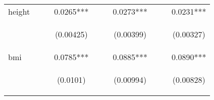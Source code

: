 \documentclass{article}[11pt,subeqn]
\begin{document}
\begin{spacing}{1.25}
\begin{sidewaystable}[!htbp]
\begin{center}
\begin{tabular}{lccccccccc}
height &  &  & 0.0265*** &  &  & 0.0273*** &  &  & 0.0231*** \\
\vspace{4pt} & \begin{footnotesize}\end{footnotesize} & \begin{footnotesize}\end{footnotesize} & \begin{footnotesize}(0.00425)\end{footnotesize} & \begin{footnotesize}\end{footnotesize} & \begin{footnotesize}\end{footnotesize} & \begin{footnotesize}(0.00399)\end{footnotesize} & \begin{footnotesize}\end{footnotesize} & \begin{footnotesize}\end{footnotesize} & \begin{footnotesize}(0.00327)\end{footnotesize} \\
bmi &  &  & 0.0785*** &  &  & 0.0885*** &  &  & 0.0890*** \\
\vspace{4pt} & \begin{footnotesize}\end{footnotesize} & \begin{footnotesize}\end{footnotesize} & \begin{footnotesize}(0.0101)\end{footnotesize} & \begin{footnotesize}\end{footnotesize} & \begin{footnotesize}\end{footnotesize} & \begin{footnotesize}(0.00994)\end{footnotesize} & \begin{footnotesize}\end{footnotesize} & \begin{footnotesize}\end{footnotesize} & \begin{footnotesize}(0.00828)\end{footnotesize} \\

\end{tabular}
\end{center}
\end{sidewaystable}
\end{spacing}
\end{document}
